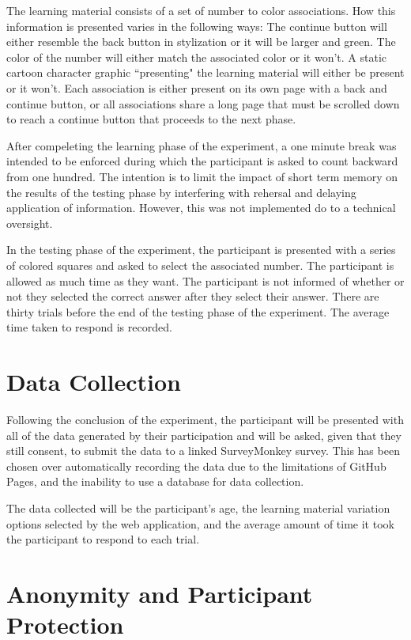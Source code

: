 \documentclass[12pt]{report}
\begin{document}
The learning material consists of a set of number to color associations. How this information is presented varies in the following ways: The continue button will either resemble the back button in stylization or it will be larger and green. The color of the number will either match the associated color or it won't. A static cartoon character graphic ``presenting" the learning material will either be present or it won't. Each association is either present on its own page with a back and continue button, or all associations share a long page that must be scrolled down to reach a continue button that proceeds to the next phase.

After compeleting the learning phase of the experiment, a one minute break was intended to be enforced during which the participant is asked to count backward from one hundred. The intention is to limit the impact of short term memory on the results of the testing phase by interfering with rehersal and delaying application of information.\cite{cowan2008differences} However, this was not implemented do to a technical oversight.

In the testing phase of the experiment, the participant is presented with a series of colored squares and asked to select the associated number. The participant is allowed as much time as they want. The participant is not informed of whether or not they selected the correct answer after they select their answer. There are thirty trials before the end of the testing phase of the experiment. The average time taken to respond is recorded.

\section{Data Collection}

Following the conclusion of the experiment, the participant will be presented with all of the data generated by their participation and will be asked, given that they still consent, to submit the data to a linked SurveyMonkey survey. This has been chosen over automatically recording the data due to the limitations of GitHub Pages, and the inability to use a database for data collection.

The data collected will be the participant's age, the learning material variation options selected by the web application, and the average amount of time it took the participant to respond to each trial.

\section{Anonymity and Participant Protection}
\end{document}
